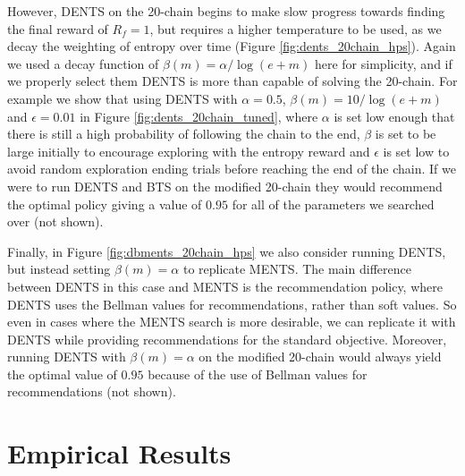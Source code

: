     However, DENTS on the 20-chain begins to make slow progress towards finding the final reward of $R_f=1$, but requires a higher temperature to be used, as we decay the weighting of entropy over time (Figure \ref{fig:dents_20chain_hps}). Again we used a decay function of $\beta(m)=\alpha/\log(e+m)$ here for simplicity, and if we properly select them DENTS is more than capable of solving the 20-chain. For example we show that using DENTS with $\alpha=0.5$, $\beta(m)=10/\log(e+m)$ and $\epsilon=0.01$ in Figure \ref{fig:dents_20chain_tuned}, where $\alpha$ is set low enough that there is still a high probability of following the chain to the end, $\beta$ is set to be large initially to encourage exploring with the entropy reward and $\epsilon$ is set low to avoid random exploration ending trials before reaching the end of the chain. If we were to run DENTS and BTS on the modified 20-chain they would recommend the optimal policy giving a value of $0.95$ for all of the parameters we searched over (not shown).
    
    Finally, in Figure \ref{fig:dbments_20chain_hps} we also consider running DENTS, but instead setting $\beta(m)=\alpha$ to replicate MENTS. The main difference between DENTS in this case and MENTS is the recommendation policy, where DENTS uses the Bellman values for recommendations, rather than soft values. So even in cases where the MENTS search is more desirable, we can replicate it with DENTS while providing recommendations for the standard objective. Moreover, running DENTS with $\beta(m)=\alpha$ on the modified 20-chain would always yield the optimal value of $0.95$ because of the use of Bellman values for recommendations (not shown).













\section{Empirical Results}
\label{sec:4-4-results}

    


